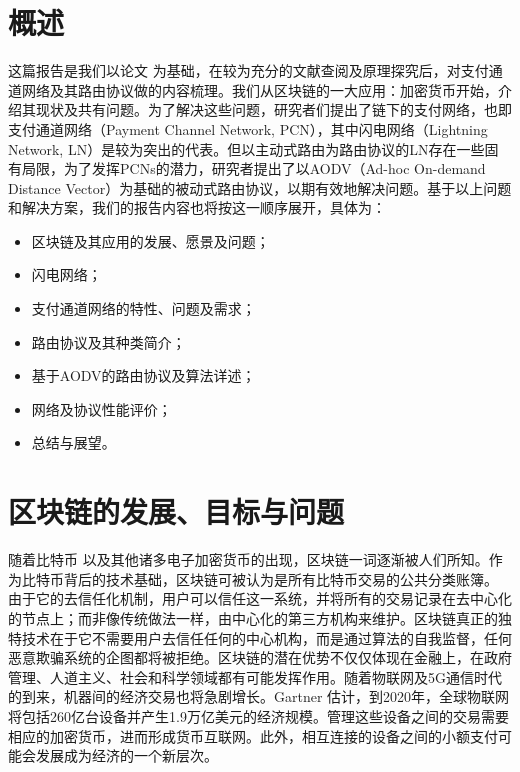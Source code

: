 \documentclass[12pt,a4paper]{article}
\begin{document}
\setlength{\parindent}{2em}



\tableofcontents
\clearpage

\section{概述}
这篇报告是我们以论文 \cite{hoenisch2018aodv} 为基础，在较为充分的文献查阅及原理探究后，对支付通道网络及其路由协议做的内容梳理。我们从区块链的一大应用：加密货币开始，介绍其现状及共有问题。为了解决这些问题，研究者们提出了链下的支付网络，也即支付通道网络（Payment Channel Network, PCN），其中闪电网络（Lightning Network, LN）是较为突出的代表。但以主动式路由为路由协议的LN存在一些固有局限，为了发挥PCNs的潜力，研究者提出了以AODV（Ad-hoc On-demand Distance Vector）为基础的被动式路由协议，以期有效地解决问题。基于以上问题和解决方案，我们的报告内容也将按这一顺序展开，具体为：
\begin{itemize}
	\item 区块链及其应用的发展、愿景及问题；
	\item 闪电网络；
	\item 支付通道网络的特性、问题及需求；
	\item 路由协议及其种类简介；
	\item 基于AODV的路由协议及算法详述；
	\item 网络及协议性能评价；
	\item 总结与展望。
\end{itemize}

\section{区块链的发展、目标与问题}
随着比特币 \cite{nakamoto2008bitcoin} 以及其他诸多电子加密货币的出现，区块链一词逐渐被人们所知。作为比特币背后的技术基础，区块链可被认为是所有比特币交易的公共分类账簿。 \cite{swan2015blockchain} 由于它的去信任化机制，用户可以信任这一系统，并将所有的交易记录在去中心化的节点上；而非像传统做法一样，由中心化的第三方机构来维护。区块链真正的独特技术在于它不需要用户去信任任何的中心机构，而是通过算法的自我监督，任何恶意欺骗系统的企图都将被拒绝。区块链的潜在优势不仅仅体现在金融上，在政府管理、人道主义、社会和科学领域都有可能发挥作用。随着物联网及5G通信时代的到来，机器间的经济交易也将急剧增长。Gartner \cite{iot_economic} 估计，到2020年，全球物联网将包括260亿台设备并产生1.9万亿美元的经济规模。管理这些设备之间的交易需要相应的加密货币，进而形成货币互联网。此外，相互连接的设备之间的小额支付可能会发展成为经济的一个新层次\cite{new_layer_economy}。
\end{document}
